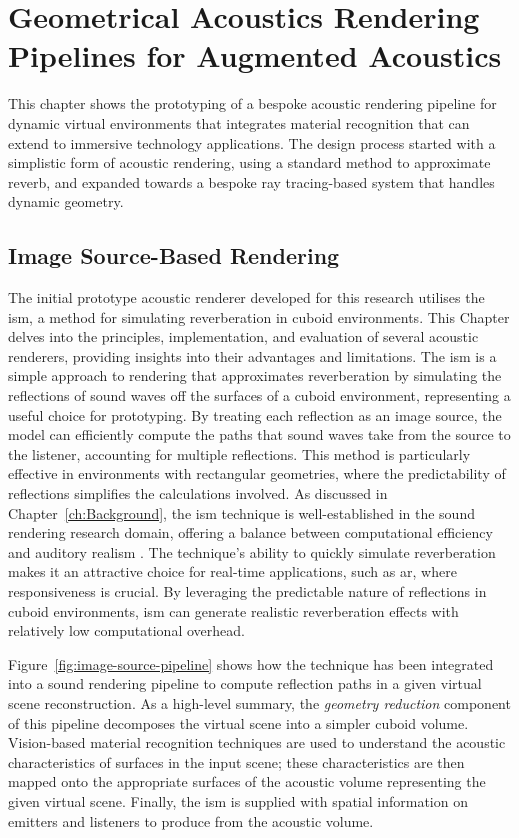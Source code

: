 \chapter{Geometrical Acoustics Rendering Pipelines for Augmented Acoustics}\label{ch:acousticrendering} %

This chapter shows the prototyping of a bespoke acoustic rendering pipeline for dynamic virtual environments that integrates material recognition that can extend to immersive technology applications. The design process started with a simplistic form of acoustic rendering, using a standard method to approximate reverb, and expanded towards a bespoke ray tracing-based system that handles dynamic geometry.

\section{Image Source-Based Rendering}
The initial prototype acoustic renderer developed for this research utilises the \acrfull{ism}, a method for simulating reverberation in cuboid environments. This Chapter delves into the principles, implementation, and evaluation of several acoustic renderers, providing insights into their advantages and limitations. The \acrshort{ism} is a simple approach to rendering that approximates reverberation by simulating the reflections of sound waves off the surfaces of a cuboid environment, representing a useful choice for prototyping. By treating each reflection as an image source, the model can efficiently compute the paths that sound waves take from the source to the listener, accounting for multiple reflections. This method is particularly effective in environments with rectangular geometries, where the predictability of reflections simplifies the calculations involved. As discussed in Chapter~\ref{ch:Background}, the \acrshort{ism} technique is well-established in the sound rendering research domain, offering a balance between computational efficiency and auditory realism  \citep{savioja1999creating, allen1979image}. The technique's ability to quickly simulate reverberation makes it an attractive choice for real-time applications, such as \acrshort{ar}, where responsiveness is crucial. By leveraging the predictable nature of reflections in cuboid environments, \acrshort{ism} can generate realistic reverberation effects with relatively low computational overhead.\par
Figure~\ref{fig:image-source-pipeline} shows how the technique has been integrated into a sound rendering pipeline to compute reflection paths in a given virtual scene reconstruction. As a high-level summary, the \emph{geometry reduction} component of this pipeline decomposes the virtual scene into a simpler cuboid volume. Vision-based material recognition techniques are used to understand the acoustic characteristics of surfaces in the input scene; these characteristics are then mapped onto the appropriate surfaces of the acoustic volume representing the given virtual scene. Finally, the \acrshort{ism} is supplied with spatial information on emitters and listeners to produce  from the acoustic volume.\par


